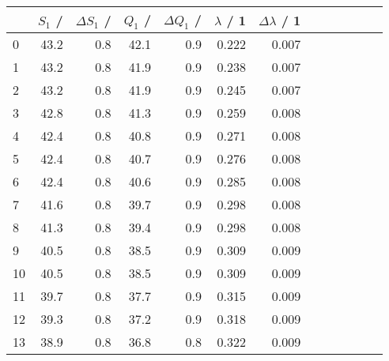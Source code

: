 \begin{tabular}{lrrrrrrrrrrrr}
	\toprule
	{} & $S_1$ / \si{\va} & $\Delta S_1$ / \si{\va} & $Q_1$ / \si{\var} & $\Delta Q_1$ / \si{\var} & $\lambda$ / 1 & $\Delta \lambda$ / 1 \\
	\midrule
	0  & 43.2             & 0.8                     & 42.1              & 0.9                      & 0.222         & 0.007                \\
	1  & 43.2             & 0.8                     & 41.9              & 0.9                      & 0.238         & 0.007                \\
	2  & 43.2             & 0.8                     & 41.9              & 0.9                      & 0.245         & 0.007                \\
	3  & 42.8             & 0.8                     & 41.3              & 0.9                      & 0.259         & 0.008                \\
	4  & 42.4             & 0.8                     & 40.8              & 0.9                      & 0.271         & 0.008                \\
	5  & 42.4             & 0.8                     & 40.7              & 0.9                      & 0.276         & 0.008                \\
	6  & 42.4             & 0.8                     & 40.6              & 0.9                      & 0.285         & 0.008                \\
	7  & 41.6             & 0.8                     & 39.7              & 0.9                      & 0.298         & 0.008                \\
	8  & 41.3             & 0.8                     & 39.4              & 0.9                      & 0.298         & 0.008                \\
	9  & 40.5             & 0.8                     & 38.5              & 0.9                      & 0.309         & 0.009                \\
	10 & 40.5             & 0.8                     & 38.5              & 0.9                      & 0.309         & 0.009                \\
	11 & 39.7             & 0.8                     & 37.7              & 0.9                      & 0.315         & 0.009                \\
	12 & 39.3             & 0.8                     & 37.2              & 0.9                      & 0.318         & 0.009                \\
	13 & 38.9             & 0.8                     & 36.8              & 0.8                      & 0.322         & 0.009                \\

\end{tabular}
